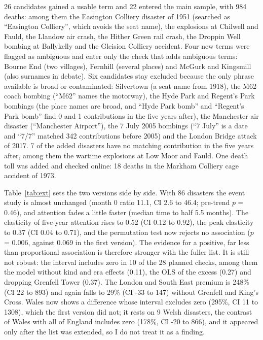 \documentclass[11pt,a4paper]{article}
\begin{document}
26 candidates gained a usable term and 22 entered the main sample, with 984 deaths: among them the Easington Colliery disaster of 1951 (searched as ``Easington Colliery'', which avoids the seat name), the explosions at Chilwell and Fauld, the Llandow air crash, the Hither Green rail crash, the Droppin Well bombing at Ballykelly and the Gleision Colliery accident. Four new terms were flagged as ambiguous and enter only the check that adds ambiguous terms: Bourne End (two villages), Fernhill (several places) and McGurk and Kingsmill (also surnames in debate). Six candidates stay excluded because the only phrase available is broad or contaminated: Silvertown (a seat name from 1918), the M62 coach bombing (``M62'' names the motorway), the Hyde Park and Regent's Park bombings (the place names are broad, and ``Hyde Park bomb'' and ``Regent's Park bomb'' find 0 and 1 contributions in the five years after), the Manchester air disaster (``Manchester Airport''), the 7 July 2005 bombings (``7 July'' is a date and ``7/7'' matched 342 contributions before 2005) and the London Bridge attack of 2017. 7 of the added disasters have no matching contribution in the five years after, among them the wartime explosions at Low Moor and Fauld. One death toll was added and checked online: 18 deaths in the Markham Colliery cage accident of 1973.

Table~\ref{tab:ext} sets the two versions side by side. With 86 disasters the event study is almost unchanged (month 0 ratio 11.1, CI 2.6 to 46.4; pre-trend $p$ = 0.46), and attention fades a little faster (median time to half 5.5 months). The elasticity of five-year attention rises to 0.52 (CI 0.12 to 0.92), the peak elasticity to 0.37 (CI 0.04 to 0.71), and the permutation test now rejects no association ($p$ = 0.006, against 0.069 in the first version). The evidence for a positive, far less than proportional association is therefore stronger with the fuller list. It is still not robust: the interval includes zero in 10 of the 28 planned checks, among them the model without kind and era effects (0.11), the OLS of the excess (0.27) and dropping Grenfell Tower (0.37). The London and South East premium is 248\% (CI 22 to 893) and again falls to 29\% (CI -33 to 147) without Grenfell and King's Cross. Wales now shows a difference whose interval excludes zero (295\%, CI 11 to 1308), which the first version did not; it rests on 9 Welsh disasters, the contrast of Wales with all of England includes zero (178\%, CI -20 to 866), and it appeared only after the list was extended, so I do not treat it as a finding.
\end{document}
